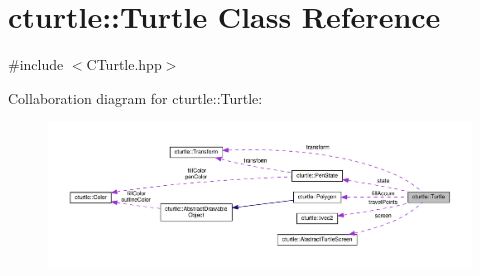\hypertarget{classcturtle_1_1Turtle}{}\section{cturtle\+:\+:Turtle Class Reference}
\label{classcturtle_1_1Turtle}


{\ttfamily \#include $<$C\+Turtle.\+hpp$>$}



Collaboration diagram for cturtle\+:\+:Turtle\+:
\nopagebreak
\begin{figure}[H]
\begin{center}
\leavevmode
\includegraphics[width=350pt]{classcturtle_1_1Turtle__coll__graph}
\end{center}
\end{figure}
